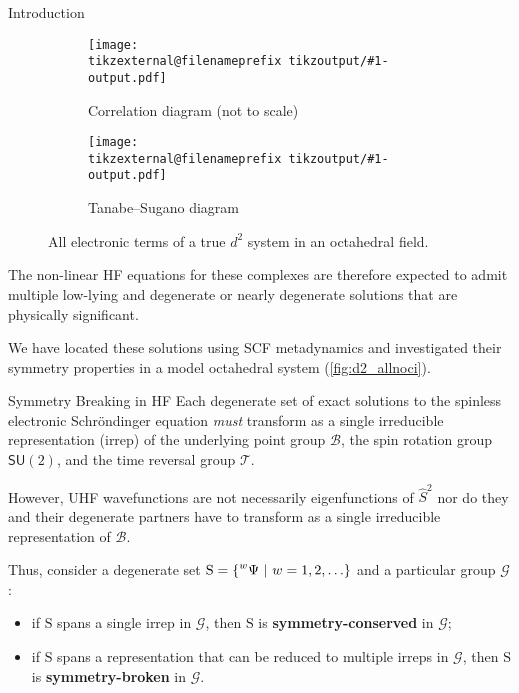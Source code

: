 \documentclass[final, xcolor={svgnames}]{beamer}
\makeatletter
\newif\iftikzex
\newcommand*{\useexternalfile}[1]{%
		\iftikzex
			\tikzsetnextfilename{tikzoutput/#1-output}%
			\scalebox{1}{}
		\else
			\texttt{[image: \\tikzexternal@filenameprefix tikzoutput/\#1-output.pdf]}
		\fi
	}
\newlength{\colwidth}
\makeatother
\begin{document}
\begin{frame}[t]
\begin{columns}[t]
\begin{column}{\colwidth}
\begin{block}{Introduction}
				\begin{figure}
					\begin{subfigure}[b]{0.49\textwidth}
						\centering
						\useexternalfile{corrd2}
						\caption{Correlation diagram (not to scale)}
					\end{subfigure}
					\hfill
					\begin{subfigure}[b]{0.49\textwidth}
						\centering
						\useexternalfile{TSd2}
						\caption{Tanabe--Sugano diagram}
					\end{subfigure}
					\caption{All electronic terms of a true $d^2$ system in an octahedral field.}
					\label{fig:corrTSd2}
				\end{figure}
				
			The non-linear HF equations for these complexes are therefore expected to admit multiple low-lying and degenerate or nearly degenerate solutions that are physically significant.
			
			We have located these solutions using SCF metadynamics and investigated their symmetry properties in a model octahedral  system (\cref{fig:d2_allnoci}).
	  	\end{block}
	
		\begin{alertblock}{Symmetry Breaking in HF}
			Each degenerate set of exact solutions to the spinless electronic Schr\"{o}ndinger equation \emph{must} transform as a single irreducible representation (irrep) of the underlying point group $\mathcal{B}$, the spin rotation group $\mathsf{SU}(2)$, and the time reversal group $\mathcal{T}$.
			
			However, UHF wavefunctions are not necessarily eigenfunctions of $\hat{S}^2$ nor do they and their degenerate partners have to transform as a single irreducible representation of $\mathcal{B}$.
			
			Thus, consider a degenerate set %
				$\mathrm{S} =
					\left\lbrace
						\prescript{w}{}{\Psi} %
						\ | \ %
						w = 1, 2, \ldots %
					\right\rbrace%
				$ %
			and a particular group $\mathcal{G}$:
				\begin{itemize}
					\item if $\mathrm{S}$ spans a single irrep in $\mathcal{G}$, then $\mathrm{S}$ is \textbf{\color{red} symmetry-conserved} in $\mathcal{G}$;
					\item if $\mathrm{S}$ spans a representation that can be reduced to multiple
					irreps in $\mathcal{G}$, then $\mathrm{S}$ is \textbf{\color{red} symmetry-broken} in $\mathcal{G}$.
				\end{itemize}


\end{alertblock}
\end{column}
\end{columns}
\end{frame}
\end{document}
